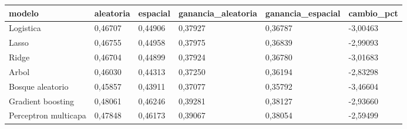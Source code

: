 \begin{tabular}{llllll}
\toprule
modelo & aleatoria & espacial & ganancia\_aleatoria & ganancia\_espacial & cambio\_pct \\
\midrule
Logistica & 0{,}46707 & 0{,}44906 & 0{,}37927 & 0{,}36787 & -3{,}00463 \\
Lasso & 0{,}46755 & 0{,}44958 & 0{,}37975 & 0{,}36839 & -2{,}99093 \\
Ridge & 0{,}46704 & 0{,}44899 & 0{,}37924 & 0{,}36780 & -3{,}01683 \\
Arbol & 0{,}46030 & 0{,}44313 & 0{,}37250 & 0{,}36194 & -2{,}83298 \\
Bosque aleatorio & 0{,}45857 & 0{,}43911 & 0{,}37077 & 0{,}35792 & -3{,}46604 \\
Gradient boosting & 0{,}48061 & 0{,}46246 & 0{,}39281 & 0{,}38127 & -2{,}93660 \\
Perceptron multicapa & 0{,}47848 & 0{,}46173 & 0{,}39067 & 0{,}38054 & -2{,}59499 \\
\bottomrule
\end{tabular}
